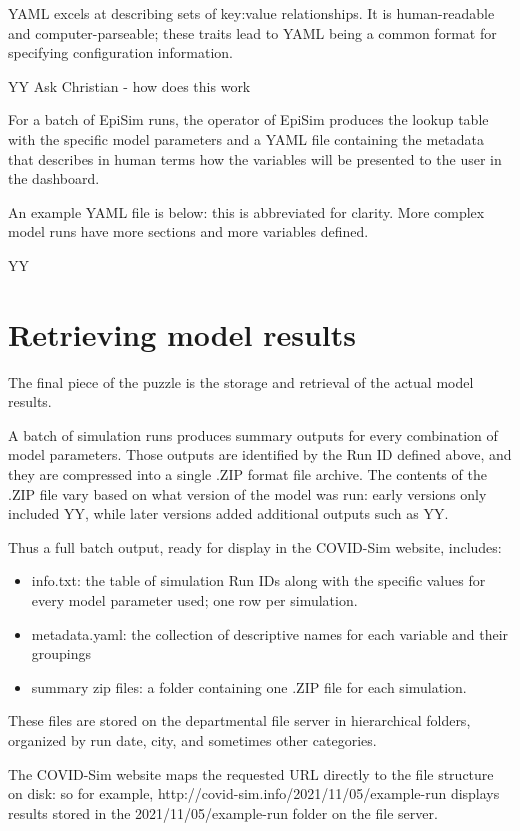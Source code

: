 YAML excels at describing sets of key:value relationships. It is
human-readable and computer-parseable; these traits lead to YAML being a
common format for specifying configuration information.

YY Ask Christian - how does this work

For a batch of EpiSim runs, the operator of EpiSim produces the lookup
table with the specific model parameters and a YAML file containing the
metadata that describes in human terms how the variables will be
presented to the user in the dashboard.

An example YAML file is below: this is abbreviated for clarity. More
complex model runs have more sections and more variables defined.

YY

\hypertarget{retrieving-model-results}{%
\section{Retrieving model results}\label{retrieving-model-results}}

The final piece of the puzzle is the storage and retrieval of the actual
model results.

A batch of simulation runs produces summary outputs for every
combination of model parameters. Those outputs are identified by the Run
ID defined above, and they are compressed into a single .ZIP format file
archive. The contents of the .ZIP file vary based on what version of the
model was run: early versions only included YY, while later versions
added additional outputs such as YY.

Thus a full batch output, ready for display in the COVID-Sim website,
includes:

\begin{itemize}
\item
  info.txt: the table of simulation Run IDs along with the specific
  values for every model parameter used; one row per simulation.
\item
  metadata.yaml: the collection of descriptive names for each variable
  and their groupings
\item
  summary zip files: a folder containing one .ZIP file for each
  simulation.
\end{itemize}

These files are stored on the departmental file server in hierarchical
folders, organized by run date, city, and sometimes other categories.

The COVID-Sim website maps the requested URL directly to the file
structure on disk: so for example,
http://covid-sim.info/2021/11/05/example-run displays results stored in
the 2021/11/05/example-run folder on the file server.


